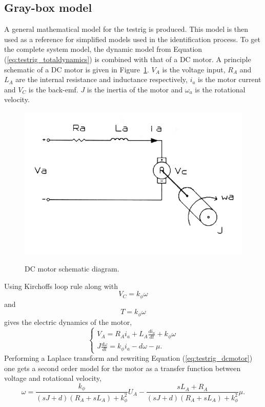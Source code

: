 \subsection{Gray-box model}
A general mathematical model for the testrig is produced. This model is then used
as a reference for simplified models used in the identification process.
To get the complete system model, the dynamic model from
Equation (\ref{eq:testrig_totaldynamics}) is combined with that of a DC motor. A
principle schematic of a DC motor is given in
Figure~\ref{fig:testrig_dcmotor_model}. $V_A$ is the voltage input, $R_A$ and
$L_A$ are the internal resistance and inductance respectively, $i_a$ is the
motor current and $V_C$ is the back-emf. $J$ is the inertia of the motor and
$\omega_a$ is the rotational velocity.
\begin{figure}[H]
    \centering\label{fig:testrig_dcmotor_model}
    \includegraphics[width=\textwidth]{./img/testrig_dcmotor_model.png}
    \caption{DC motor schematic diagram.}
\end{figure}
Using Kirchoffs loop rule along with 
\begin{equation} \label{eq:testrig_kphi_v}
    V_C = k_{\phi} \omega
\end{equation}
and 
\begin{equation} \label{eq:testrig_kphi_i}
    T = k_{\phi} \omega
\end{equation}
gives the electric dynamics of the motor,
\begin{equation} \label{eq:testrig_dcmotor}
    \begin{cases} 
        V_A = R_A i_a + L_A \frac{di_a}{dt} + k_{\phi}\omega \\
        J \frac{d\omega} {dt} = k_{\phi} i_a - d\omega - \mu. 
    \end{cases}
\end{equation}
Performing a Laplace transform and rewriting Equation (\ref{eq:testrig_dcmotor})
one gets a second order model for the motor as a transfer function between
voltage and rotational velocity,
\begin{equation} \label{eq:testrig_motor_2ndorder}
    \omega = \frac {k_{\phi}} {(sJ + d) (R_A + sL_A) + k_{\phi}^2} U_A -
    \frac {sL_A + R_A} {(sJ + d) (R_A + sL_A) + k_{\phi}^2} \mu.
\end{equation}
